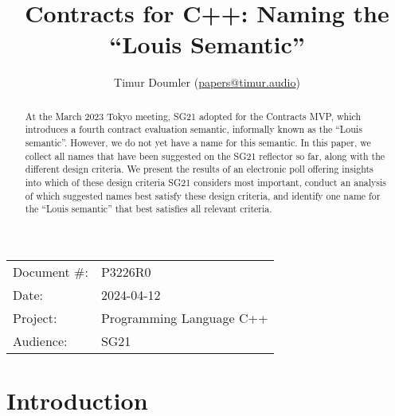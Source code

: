 

 \usepackage[bottom]{footmisc} 
 
 \usepackage{longtable}



\title{Contracts for C++: Naming the ``Louis Semantic''}
\author{ Timur Doumler \small(\href{mailto:papers@timur.audio}{papers@timur.audio}) 
}
\date{}
\maketitle

\begin{tabular}{ll}
Document \#: & P3226R0 \\
Date: &2024-04-12 \\
Project: & Programming Language C++ \\
Audience: & SG21
\end{tabular}

\begin{abstract}
At the March 2023 Tokyo meeting, SG21 adopted \cite{P3191R0} for the Contracts MVP, which introduces a fourth contract evaluation semantic, informally known as the ``Louis semantic''. However, we do not yet have a name for this semantic. In this paper, we collect all names that have been suggested on the SG21 reflector so far, along with the different design criteria. We present the results of an electronic poll offering insights into which of these design criteria SG21 considers most important, conduct an analysis of which suggested names best satisfy these design criteria, and identify one name for the ``Louis semantic'' that best satisfies all relevant criteria.
\end{abstract}


\section{Introduction}
\label{sec:intro}

